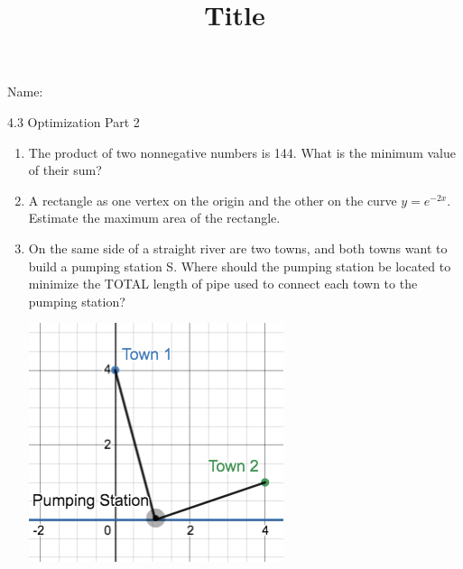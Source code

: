 \documentclass[12pt]{article}
\title{Title}
\begin{document}

 Name:
 \begin{center}\large{4.3 Optimization Part 2}\end{center}

\begin{enumerate}

\item The product of two nonnegative numbers is 144. What is the minimum value of their sum?
	
\vfill

\item A rectangle as one vertex on the origin and the other on the curve $y=e^{-2x}$. Estimate the maximum area of the rectangle.
\vfill

\item On the same side of a straight river are two towns, and both towns want to build a pumping station S. Where should the pumping station be located to minimize the TOTAL length of pipe used to connect each town to the pumping station?

	\includegraphics [scale=.7]{4_3_pump}
\vfill

\end{enumerate}
\end{document}
